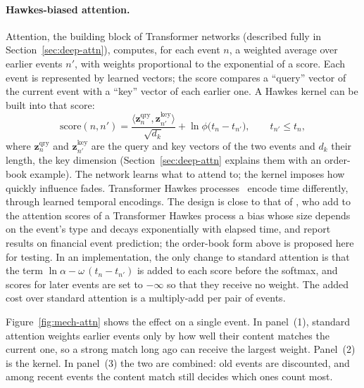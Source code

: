 \paragraph{Hawkes-biased attention.} Attention, the building block of Transformer networks (described
fully in Section~\ref{sec:deep-attn}), computes, for each event $n$, a weighted average over earlier events $n'$,
with weights proportional to the exponential of a score. Each event is represented by learned vectors; the
score compares a ``query'' vector of the current event with a ``key'' vector of each earlier one. A Hawkes kernel can be
built into that score:
\begin{equation}
  \text{score}(n, n') = \frac{\langle \mathbf{z}^{\text{qry}}_n, \mathbf{z}^{\text{key}}_{n'} \rangle}{\sqrt{d_k}}
  + \ln \phi\big(t_n - t_{n'}\big), \qquad t_{n'} \le t_n ,
\end{equation}
where $\mathbf{z}^{\text{qry}}_n$ and $\mathbf{z}^{\text{key}}_{n'}$ are the query and key vectors of the
two events and $d_k$ their length, the key dimension (Section~\ref{sec:deep-attn} explains them with an
order-book example).
 The network learns what to attend to; the kernel imposes how quickly influence
fades. Transformer Hawkes processes~\citep{zuo2020thp,zhang2020sahp} encode time differently, through
learned temporal encodings. The design is close to that of \citet{hwang2025shockbiased}, who add to
the attention scores of a Transformer Hawkes process a bias whose size depends on the event's type and decays
exponentially with elapsed time, and report results on financial event prediction; the order-book form above is
proposed here for testing. In an implementation, the only change to standard
attention is that the term $\ln\alpha - \omega\,(t_n - t_{n'})$ is added to each score before the softmax, and scores for
later events are set to $-\infty$ so that they receive no weight.
The added cost over standard attention is a multiply-add per pair of events.

Figure~\ref{fig:mech-attn} shows the effect on a single event. In panel~(1), standard attention weights earlier
events only by how well their content matches the current one, so a strong match long ago can receive the
largest weight. Panel~(2) is the kernel. In panel~(3) the two are combined: old events are discounted, and
among recent events the content match still decides which ones count most.

